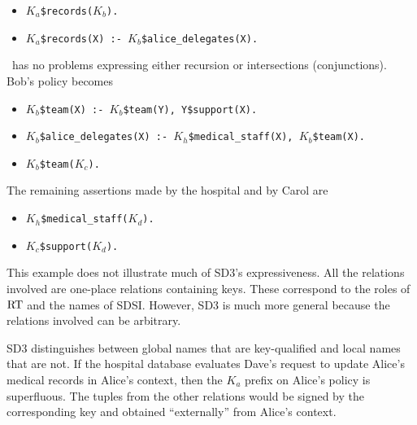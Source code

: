 \documentclass{article}
\begin{document}
\begin{itemize}
\item \texttt{$K_a$\$records($K_b$).}
\item \texttt{$K_a$\$records(X) :- $K_b$\$alice\_delegates(X).}
\end{itemize}

\datalog\ has no problems expressing either recursion or intersections
(conjunctions). Bob's policy becomes

\begin{itemize}
\item \texttt{$K_b$\$team(X) :- $K_b$\$team(Y), Y\$support(X).}
\item \texttt{$K_b$\$alice\_delegates(X) :- $K_h$\$medical\_staff(X), $K_b$\$team(X).}
\item \texttt{$K_b$\$team($K_c$).}
\end{itemize}

The remaining assertions made by the hospital and by Carol are

\begin{itemize}
\item \texttt{$K_h$\$medical\_staff($K_d$).}
\item \texttt{$K_c$\$support($K_d$).}
\end{itemize}

This example does not illustrate much of SD3's expressiveness. All the
relations involved are one-place relations containing keys. These
correspond to the roles of $\text{RT}$ and the names of SDSI. However, SD3 is
much more general because the relations involved can be arbitrary.

SD3 distinguishes between global names that are key-qualified and local
names that are not. If the hospital database evaluates Dave's request to
update Alice's medical records in Alice's context, then the $K_a$ prefix on
Alice's policy is superfluous. The tuples from the other relations would be
signed by the corresponding key and obtained ``externally'' from Alice's
context.



\end{document}
